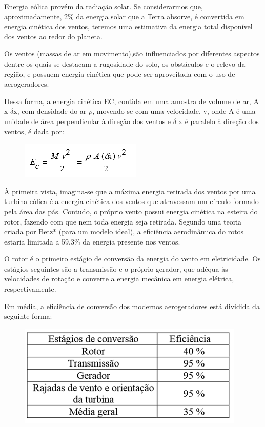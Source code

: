 \documentclass[12pt,openright,oneside,a4paper,brazil]{abntex2}
\begin{document}
\begin{enumerate}
	Energia eólica provém da radiação solar. Se considerarmos que, aproximadamente, 2\% da energia solar que a Terra absorve, é convertida em energia cinética dos ventos, teremos uma estimativa da energia total disponível dos ventos ao redor do planeta. 
	
	Os ventos (massas de ar em movimento),são influenciados por diferentes aspectos dentre os quais se destacam a rugosidade do solo, os obstáculos e o relevo da região, e possuem energia cinética que pode ser aproveitada com o uso de aerogeradores. 
	
	Dessa forma, a energia cinética EC, contida em uma amostra de volume de ar, A x $\delta$x, com densidade do ar $\rho$, movendo-se com uma velocidade, v,  onde A é uma unidade de área perpendicular à direção dos ventos e $\delta$ x é paralelo à direção dos  ventos, é dada por:
	\begin{figure}[!htbp]
\centering
\includegraphics[scale=1]{equacao}
\FloatBarrier
\end{figure}


À primeira vista, imagina-se que a máxima energia retirada dos ventos por uma turbina eólica é a energia cinética dos ventos que atravessam um círculo formado pela área das pás. Contudo, o próprio vento possui energia cinética na esteira do rotor, fazendo com que nem toda energia seja retirada. Segundo uma teoria criada por Betz* (para um modelo ideal), a eficiência aerodinâmica do rotos estaria limitada a 59,3\% da energia presente nos ventos. 

	O rotor é o primeiro estágio de conversão da energia do vento em eletricidade. Os estágios seguintes são a transmissão e o próprio gerador, que adéqua às velocidades de rotação e converte a energia mecânica em energia elétrica, respectivamente. 
	
	Em média, a eficiência de conversão dos modernos aerogeradores está dividida da seguinte forma:
\begin{figure}[!htbp]
\centering
\includegraphics[scale=1]{conversao}
\FloatBarrier
\end{figure}


\end{enumerate}
\end{document}
